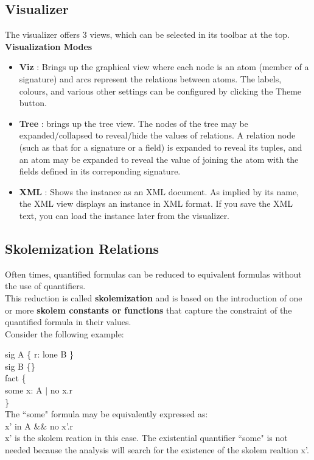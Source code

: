 \documentclass[a4paper,12pt]{extarticle}
\begin{document}
\subsection{Visualizer} 
\label{visualiser}
The visualizer offers 3 views, which can be selected in its toolbar at the top.\\
\textbf{Visualization Modes} 
\begin{itemize}
\item \textbf{Viz} : Brings up the graphical view where each node is an atom (member of a signature) and arcs represent the relations between atoms. 
The labels, colours, and various other settings can be configured by clicking the Theme button. 
\item \textbf{Tree} : brings up the tree view. The nodes of the tree may be expanded/collapsed to reveal/hide the values of relations. A relation node (such as that for a signature or a field) is expanded to reveal its tuples, and an atom may be expanded to reveal the value of joining the atom with the fields defined in its correponding signature. 
\item \textbf{XML} : Shows the instance as an XML document. As implied by its name, the XML view displays an instance in XML format. If you save the XML text, you can load the instance later from the visualizer.
\end{itemize}  
\subsection{Skolemization Relations }
\label{Skolemization relations}
Often times, quantified formulas can be reduced to equivalent formulas without the use of quantifiers.\\
This reduction is called \textbf{skolemization} and is based on the introduction of one or more \textbf{skolem constants or functions} that capture the constraint of the quantified formula in their values. \\
Consider the following example: 

sig A \{ r: lone B \} \\

sig B \{\}\\

fact \{\\

    some x: A $|$ no x.r\\

\}\\
The ``some" formula may be equivalently expressed as: \\
    x' in A \&\& no x'.r \\
x' is the skolem reation in this case. The existential quantifier ``some" is not needed because the analysis will search for the existence of the skolem realtion x'.  
\end{document}
